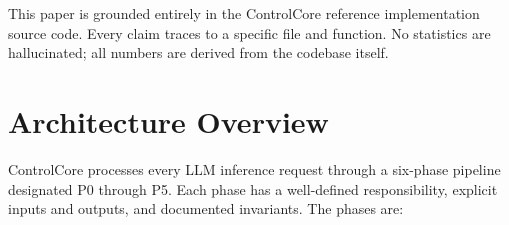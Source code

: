 \documentclass[11pt,a4paper]{article}
\theoremstyle{plain}
\theoremstyle{definition}
\begin{document}
This paper is grounded entirely in the ControlCore reference implementation
source code. Every claim traces to a specific file and function. No statistics
are hallucinated; all numbers are derived from the codebase itself.

\section{Architecture Overview}
\label{sec:architecture}

ControlCore processes every LLM inference request through a six-phase pipeline
designated P0 through P5. Each phase has a well-defined responsibility, explicit
inputs and outputs, and documented invariants. The phases are:
\end{document}

